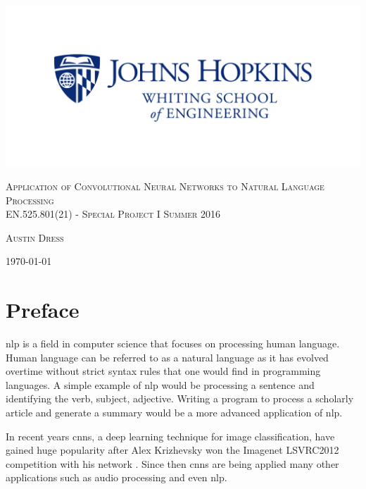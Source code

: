 \documentclass[12pt]{article}
\begin{document}
\begin{titlepage}
	\centering
	\includegraphics[width=\textwidth]{jhu_logo.png}\par\vspace{2cm}
	{\scshape\Huge Application of Convolutional Neural Networks to Natural Language Processing \\
	\vspace{1.5cm}
	 \scshape\Large EN.525.801(21) - Special Project I Summer 2016\par}
	{\scshape \Large Austin Dress\par} 
	\vspace{0.75cm}
	\vfill
	{\large \today\par}
\end{titlepage}

\tableofcontents
\listoftables

\newpage

\section{Preface} 
\ac{nlp} is a field in computer science that focuses on processing human language. Human language can be referred to as a natural language as it has evolved overtime without strict syntax rules that one would find in programming languages. A simple example of \ac{nlp} would be processing a sentence and identifying the verb, subject, adjective. Writing a program to process a scholarly article and generate a summary would be a more advanced application of \ac{nlp}.

In recent years \ac{cnn}s, a deep learning technique for image classification, have gained huge popularity after Alex Krizhevsky won the Imagenet LSVRC2012 competition with his network \cite{alex}. Since then \ac{cnn}s are being applied many other applications such as audio processing and even \ac{nlp}.
\end{document}
